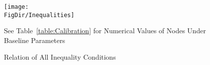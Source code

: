 \begin{figure}[h]
  \centerline{
    \texttt{[image: \\FigDir/Inequalities]}
  }
  \caption{Relation of All Inequality Conditions} \label{fig:Inequalities}
\centerline{See Table~\ref{table:Calibration} for Numerical Values of Nodes Under Baseline Parameters}
\end{figure}
